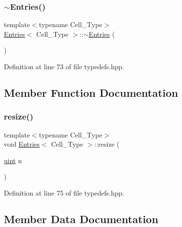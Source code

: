 \mbox{\label{class_entries_aeda42186376731bd3a9b3902a09395a4}} 
\subsubsection{\texorpdfstring{$\sim$\+Entries()}{~Entries()}}
{\footnotesize\ttfamily template$<$typename Cell\+\_\+\+Type$>$ \\
\hyperlink{class_entries}{Entries}$<$ Cell\+\_\+\+Type $>$\+::$\sim$\hyperlink{class_entries}{Entries} (\begin{DoxyParamCaption}{ }\end{DoxyParamCaption})\hspace{0.3cm}{\ttfamily [inline]}}



Definition at line 73 of file typedefs.\+hpp.



\subsection{Member Function Documentation}
\mbox{\label{class_entries_a8b539e4c53aab5d6ce8305af346b7089}} 
\subsubsection{\texorpdfstring{resize()}{resize()}}
{\footnotesize\ttfamily template$<$typename Cell\+\_\+\+Type$>$ \\
void \hyperlink{class_entries}{Entries}$<$ Cell\+\_\+\+Type $>$\+::resize (\begin{DoxyParamCaption}\item[{\hyperlink{typedefs_8hpp_a91ad9478d81a7aaf2593e8d9c3d06a14}{uint}}]{n }\end{DoxyParamCaption})\hspace{0.3cm}{\ttfamily [inline]}}



Definition at line 75 of file typedefs.\+hpp.



\subsection{Member Data Documentation}
\mbox{\label{class_entries_a6a7c589df4cd6ea98386466440dfdc98}} 
